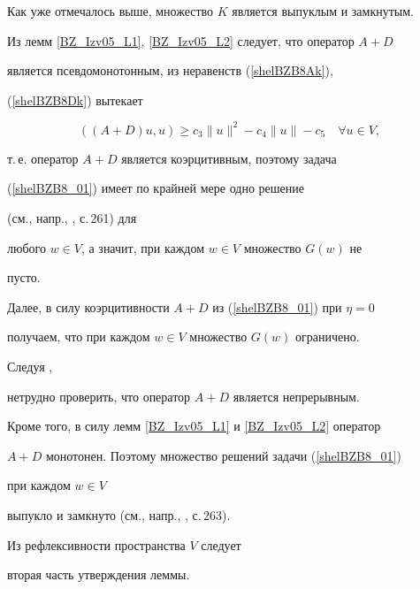 \begin{pf}


Как уже отмечалось выше, множество $K$ является выпуклым и замкнутым.


Из лемм \ref{BZ_Izv05_L1}, \ref{BZ_Izv05_L2} следует, что оператор $A+D$


является псевдомонотонным, из неравенств (\ref{shelBZB8Ak}),


(\ref{shelBZB8Dk}) вытекает


\begin{equation}


((A+D)u,u) \geq c_3 \|u\|^2-c_4 \|u\|-c_5


\quad \forall u \in V,


\label{shelBZB8A+Dk}


\end{equation}


т.\,е. оператор $A+D$ является коэрцитивным, поэтому задача


(\ref{shelBZB8_01}) имеет по крайней мере одно решение


(см., напр., \cite{bz_Iz05_Lio_72}, с.\,261) для


любого $w \in V$, а значит, при каждом $w \in V$ множество $G(w)$ не


пусто.





Далее, в силу коэрцитивности $A+D$ из (\ref{shelBZB8_01}) при $\eta=0$


получаем, что при каждом $w \in V$ множество $G(w)$ ограничено.





Следуя \cite{bz_Iz05_KL_73_IV},


нетрудно проверить, что оператор $A+D$ является непрерывным.


Кроме того, в силу лемм \ref{BZ_Izv05_L1} и \ref{BZ_Izv05_L2} оператор


$A+D$ монотонен. Поэтому множество решений задачи (\ref{shelBZB8_01})


при каждом $w \in V$


выпукло и замкнуто (см., напр., \cite{bz_Iz05_Lio_72}, с.\,263).





Из рефлексивности пространства $V$ следует


вторая часть утверждения леммы.


\end{pf}





